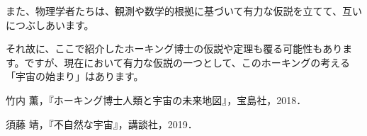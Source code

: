 \documentclass[10pt,b5paper,papersize,dvipdfmx]{jsbook}
\begin{document}
また、物理学者たちは、観測や数学的根拠に基づいて有力な仮説を立てて、互いにつぶしあいます。\par
それ故に、ここで紹介したホーキング博士の仮説や定理も覆る可能性もあります。ですが、現在において有力な仮説の一つとして、このホーキングの考える「宇宙の始まり」はあります。\par




\begin{thebibliography}{99}
  \item 竹内 薫，『ホーキング博士人類と宇宙の未来地図』，宝島社，2018．
  \item 須藤 靖，『不自然な宇宙』，講談社，2019．
\end{thebibliography}
\end{document}
